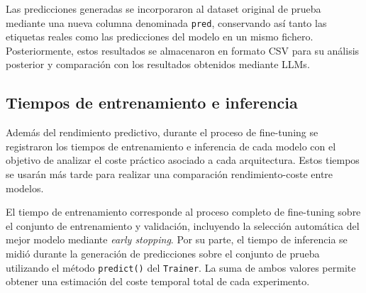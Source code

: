 Las predicciones generadas se incorporaron al dataset original de prueba mediante una nueva columna denominada \texttt{pred}, conservando así tanto las etiquetas reales como las predicciones del modelo en un mismo fichero. Posteriormente, estos resultados se almacenaron en formato CSV para su análisis posterior y comparación con los resultados obtenidos mediante \acp{LLM}.

\subsection{Tiempos de entrenamiento e inferencia}

Además del rendimiento predictivo, durante el proceso de fine-tuning se registraron los tiempos de entrenamiento e inferencia de cada modelo con el objetivo de analizar el coste práctico asociado a cada arquitectura. Estos tiempos se usarán más tarde para realizar una comparación rendimiento-coste entre modelos.

El tiempo de entrenamiento corresponde al proceso completo de fine-tuning sobre el conjunto de entrenamiento y validación, incluyendo la selección automática del mejor modelo mediante \textit{early stopping}. Por su parte, el tiempo de inferencia se midió durante la generación de predicciones sobre el conjunto de prueba utilizando el método \texttt{predict()} del \texttt{Trainer}. La suma de ambos valores permite obtener una estimación del coste temporal total de cada experimento.

